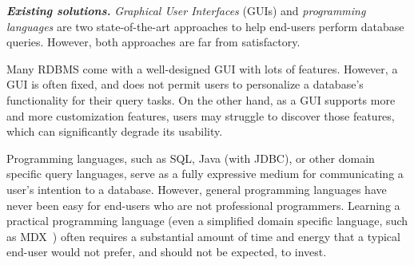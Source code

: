 









\vspace{1mm}
\noindent \textbf{\textit{Existing solutions.}}
\textit{Graphical User Interfaces} (GUIs) and \textit{programming languages}
are two state-of-the-art approaches to help end-users perform
database queries. However, both approaches are far from satisfactory.

Many RDBMS come with a well-designed GUI with lots of features.
However, 
a GUI is often fixed, and does not permit users to personalize
a database's functionality for their query tasks. On the other hand,
as a GUI supports more and more customization features, users
may struggle to discover those features, which can significantly
degrade its usability. 

Programming languages, such as SQL,
Java (with JDBC), or other domain specific query languages, 
serve as a fully expressive medium  for
communicating a user's intention to a database. However, 
general programming languages have never been easy for
end-users who are not professional programmers.  Learning
a practical programming language (even a simplified domain
specific language, such as MDX~\cite{mdx}) often requires a substantial amount
of time and energy that a typical end-user would not prefer,
and should not be expected, to invest. 



